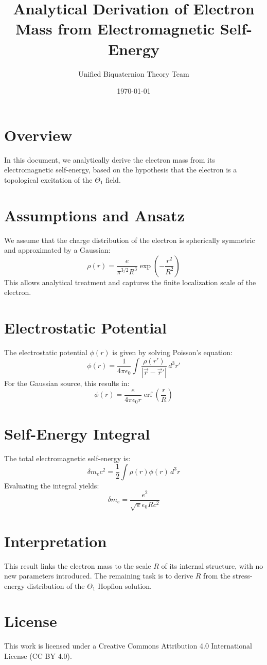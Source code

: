 \documentclass{article}
\title{Analytical Derivation of Electron Mass from Electromagnetic Self-Energy}
\author{Unified Biquaternion Theory Team}
\date{\today}
\begin{document}
\maketitle

\section*{Overview}
In this document, we analytically derive the electron mass from its electromagnetic self-energy, based on the hypothesis that the electron is a topological excitation of the $\Theta_1$ field.

\section*{Assumptions and Ansatz}
We assume that the charge distribution of the electron is spherically symmetric and approximated by a Gaussian:
\[
\rho(r) = \frac{e}{\pi^{3/2} R^3} \exp\left(-\frac{r^2}{R^2}\right)
\]
This allows analytical treatment and captures the finite localization scale of the electron.

\section*{Electrostatic Potential}
The electrostatic potential $\phi(r)$ is given by solving Poisson's equation:
\[
\phi(r) = \frac{1}{4\pi\epsilon_0} \int \frac{\rho(r')}{|\vec{r} - \vec{r}'|} \, d^3r'
\]
For the Gaussian source, this results in:
\[
\phi(r) = \frac{e}{4\pi\epsilon_0 r} \operatorname{erf}\left( \frac{r}{R} \right)
\]

\section*{Self-Energy Integral}
The total electromagnetic self-energy is:
\[
\delta m_e c^2 = \frac{1}{2} \int \rho(r) \phi(r) \, d^3r
\]
Evaluating the integral yields:
\[
\delta m_e = \frac{e^2}{\sqrt{\pi} \epsilon_0 R c^2}
\]

\section*{Interpretation}
This result links the electron mass to the scale $R$ of its internal structure, with no new parameters introduced. The remaining task is to derive $R$ from the stress-energy distribution of the $\Theta_1$ Hopfion solution.


\section*{License}
This work is licensed under a Creative Commons Attribution 4.0 International License (CC BY 4.0).
\end{document}
